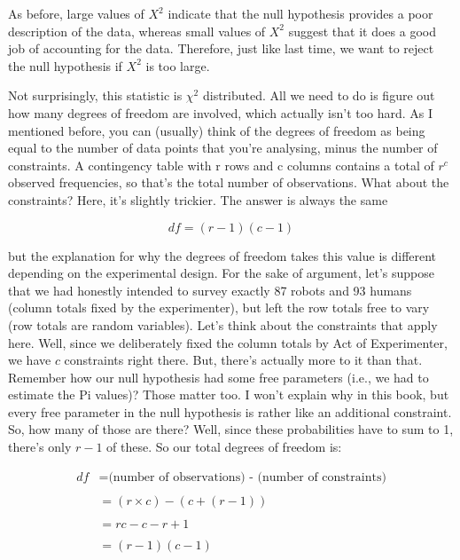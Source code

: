 \documentclass[
  a4paper,
]{book}
\begin{document}
As before, large values of \(X^2\) indicate that the null hypothesis
provides a poor description of the data, whereas small values of \(X^2\)
suggest that it does a good job of accounting for the data. Therefore,
just like last time, we want to reject the null hypothesis if \(X^2\) is
too large.

Not surprisingly, this statistic is \(\chi^2\) distributed. All we need
to do is figure out how many degrees of freedom are involved, which
actually isn't too hard. As I mentioned before, you can (usually) think
of the degrees of freedom as being equal to the number of data points
that you're analysing, minus the number of constraints. A contingency
table with r rows and c columns contains a total of \(r^{c}\) observed
frequencies, so that's the total number of observations. What about the
constraints? Here, it's slightly trickier. The answer is always the same

\[df=(r-1)(c-1)\]

but the explanation for why the degrees of freedom takes this value is
different depending on the experimental design. For the sake of
argument, let's suppose that we had honestly intended to survey exactly
87 robots and 93 humans (column totals fixed by the experimenter), but
left the row totals free to vary (row totals are random variables).
Let's think about the constraints that apply here. Well, since we
deliberately fixed the column totals by Act of Experimenter, we have
\(c\) constraints right there. But, there's actually more to it than
that. Remember how our null hypothesis had some free parameters (i.e.,
we had to estimate the Pi values)? Those matter too. I won't explain why
in this book, but every free parameter in the null hypothesis is rather
like an additional constraint. So, how many of those are there? Well,
since these probabilities have to sum to 1, there's only \(r - 1\) of
these. So our total degrees of freedom is:

\[ \begin{split} df & = \text{(number of
observations) - (number of constraints)} \\\\ & = (r \times c) - (c +
(r - 1)) \\\\ & = rc - c - r + 1 \\\\ & = (r - 1)(c - 1) \end{split}\]
\end{document}
